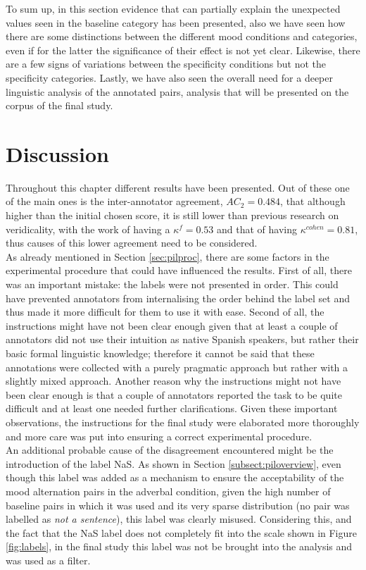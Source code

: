 To sum up, in this section evidence that can partially explain the unexpected values seen in the baseline category has been presented, also we have seen how there are some distinctions between the different mood conditions and categories, even if for the latter the significance of their effect is not yet clear. Likewise, there are a few signs of variations between the specificity conditions but not the specificity categories. Lastly, we have also seen the overall need for a deeper linguistic analysis of the annotated pairs, analysis that will be presented on the corpus of the final study.\\

\section{Discussion}
\label{sect:pildisc}
Throughout this chapter different results have been presented. Out of these one of the main ones is the inter-annotator agreement, $AC_2=0.484$, that although higher than the initial chosen score, it is still lower than previous research on veridicality, with the work of \citet{de2012did} having a $\kappa^f=0.53$ and that of \citet{sauri2009factbank} having $\kappa^{cohen} = 0.81$, thus causes of this lower agreement need to be considered.\\

As already mentioned in Section \ref{sec:pilproc}, there are some factors in the experimental procedure that could have influenced the results. First of all, there was an important mistake: the labels were not presented in order. This could have prevented annotators from internalising the order behind the label set and thus made it more difficult for them to use it with ease. Second of all, the instructions might have not been clear enough given that at least a couple of annotators did not use their intuition as native Spanish speakers, but rather their basic formal linguistic knowledge; therefore it cannot be said that these annotations were collected with a purely pragmatic approach but rather with a slightly mixed approach. Another reason why the instructions might not have been clear enough is that a couple of annotators reported the task to be quite difficult and at least one needed further clarifications. Given these important observations, the instructions for the final study were elaborated more thoroughly and more care was put into ensuring a correct experimental procedure.\\

An additional probable cause of the disagreement encountered might be the introduction of the label NaS. As shown in Section \ref{subsect:piloverview}, even though this label was added as a mechanism to ensure the acceptability of the mood alternation pairs in the adverbal condition, given the high number of baseline pairs in which it was used and its very sparse distribution (no pair was labelled as \textit{not a sentence}), this label was clearly misused. Considering this, and the fact that the NaS label does not completely fit into the scale shown in Figure \ref{fig:labels}, in the final study this label was not be brought into the analysis and was used as a filter.\\

